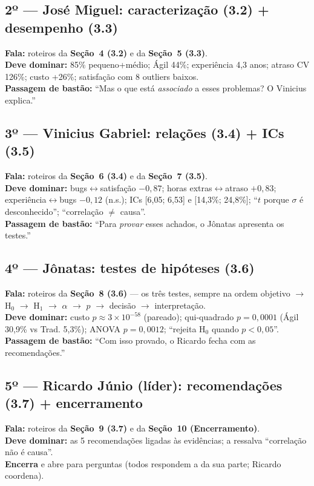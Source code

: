 \documentclass[a4paper, 11pt]{article}
\begin{document}
\subsection*{2º --- José Miguel: caracterização (3.2) + desempenho (3.3)}
\textbf{Fala:} roteiros da \textbf{Seção~4 (3.2)} e da \textbf{Seção~5 (3.3)}.\\
\textbf{Deve dominar:} 85\% pequeno+médio; Ágil 44\%; experiência 4,3 anos; atraso CV 126\%;
custo +26\%; satisfação com 8 outliers baixos.\\
\textbf{Passagem de bastão:} ``Mas o que está \emph{associado} a esses problemas? O Vinicius explica.''

\subsection*{3º --- Vinicius Gabriel: relações (3.4) + ICs (3.5)}
\textbf{Fala:} roteiros da \textbf{Seção~6 (3.4)} e da \textbf{Seção~7 (3.5)}.\\
\textbf{Deve dominar:} bugs$\leftrightarrow$satisfação $-0{,}87$; horas extras$\leftrightarrow$atraso
$+0{,}83$; experiência$\leftrightarrow$bugs $-0{,}12$ (n.s.); ICs [6,05; 6,53] e [14,3\%; 24,8\%];
``$t$ porque $\sigma$ é desconhecido''; ``correlação $\neq$ causa''.\\
\textbf{Passagem de bastão:} ``Para \emph{provar} esses achados, o Jônatas apresenta os testes.''

\subsection*{4º --- Jônatas: testes de hipóteses (3.6)}
\textbf{Fala:} roteiros da \textbf{Seção~8 (3.6)} --- os três testes, sempre na ordem
objetivo $\to$ H$_0$ $\to$ H$_1$ $\to$ $\alpha$ $\to$ $p$ $\to$ decisão $\to$ interpretação.\\
\textbf{Deve dominar:} custo $p\approx3\times10^{-58}$ (pareado); qui-quadrado $p=0{,}0001$
(Ágil 30,9\% vs Trad. 5,3\%); ANOVA $p=0{,}0012$; ``rejeita H$_0$ quando $p<0{,}05$''.\\
\textbf{Passagem de bastão:} ``Com isso provado, o Ricardo fecha com as recomendações.''

\subsection*{5º --- Ricardo Júnio (líder): recomendações (3.7) + encerramento}
\textbf{Fala:} roteiros da \textbf{Seção~9 (3.7)} e da \textbf{Seção~10 (Encerramento)}.\\
\textbf{Deve dominar:} as 5 recomendações ligadas às evidências; a ressalva ``correlação não é causa''.\\
\textbf{Encerra} e abre para perguntas (todos respondem a da sua parte; Ricardo coordena).
\end{document}
